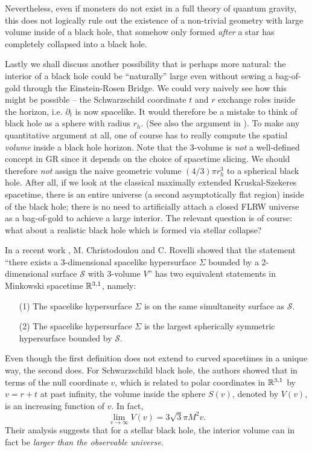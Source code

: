 \documentclass[12pt]{article}
\newcommand{\2}{$^2$}
\newcommand{\3}{$^3$}
\newcommand{\4}{$_4$}
\newcommand{\5}{$_5$}
\begin{document}
Nevertheless, even if monsters do not exist in a full theory of quantum gravity, this does not logically rule out the existence of a non-trivial geometry with large volume inside of a black hole, that somehow only formed \emph{after} a star has completely collapsed into a black hole. 

Lastly we shall discuss another possibility that is perhaps more natural: the interior of a black hole could be ``naturally'' large even without sewing a bag-of-gold through the Einstein-Rosen Bridge. We could very naively see how this might be possible -- the Schwarzschild coordinate $t$ and $r$ exchange roles inside the horizon, i.e. $\partial_t$ is now spacelike. It would therefore be a mistake to think of black hole as a sphere with radius $r_h$. (See also the argument in \cite{mathurped}). To make any quantitative argument at all, one of course has to really compute the spatial \emph{volume} inside a black hole horizon. Note that the 3-volume is \emph{not} a well-defined concept in GR since it depends on the choice of spacetime slicing. We should therefore \emph{not} assign the naive geometric volume $(4/3)\pi r_h^3$ to a spherical black hole. 
After all, if we look at the classical maximally extended Kruskal-Szekeres spacetime, there is an entire universe (a second asymptotically flat region) inside of the black hole; there is no need to artificially attach a closed FLRW universe as a bag-of-gold to achieve a large interior. The relevant question is of course: what about a realistic black hole which is formed via stellar collapse?

In a recent work \cite{MCCR}, M. Christodoulou and C. Rovelli showed that the statement  ``there exists a 3-dimensional spacelike hypersurface $\Sigma$ bounded by a 2-dimensional surface $\mathcal{S}$ with 3-volume $V$'' has two equivalent statements in Minkowski spacetime $\Bbb{R}^{3,1}$, namely:
\begin{itemize}
\item[(1)] The spacelike hypersurface $\Sigma$ is on the same simultaneity surface as $\mathcal{S}$.
\item[(2)] The spacelike hypersurface $\Sigma$ is the largest spherically symmetric hypersurface bounded by $\mathcal{S}$.
\end{itemize}
Even though the first definition does not extend to curved spacetimes in a unique way, the second does. For Schwarzschild black hole, the authors showed that in terms of the null coordinate $v$,
which is related to polar coordinates in $\Bbb{R}^{3,1}$ by $v = r + t$  at past infinity, the volume inside the sphere $S(v)$, denoted by $V(v)$, is an increasing function of $v$. In fact, 
\begin{equation}
\lim_{v \to \infty} V(v) = 3\sqrt{3} \pi M^2 v.
\end{equation}
Their analysis suggests that for a stellar black hole, the interior volume can in fact be \emph{larger than the observable universe}.
\end{document}
